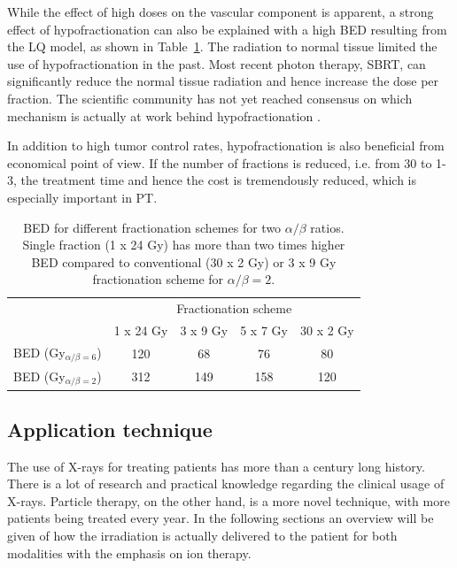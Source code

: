 While the effect of high doses on the vascular component is apparent, a strong effect of hypofractionation can also be explained with a high BED resulting from the LQ model, as shown in Table~\ref{Tab:BED}.
The radiation to normal tissue limited the use of hypofractionation in the past. Most recent photon therapy, SBRT, can significantly reduce the normal tissue radiation and hence increase the dose per fraction.
The scientific community has not yet reached consensus on which mechanism is actually at work behind hypofractionation \cite{Park2012a}.

In addition to high tumor control rates, hypofractionation is also beneficial from economical point of view. If the number of fractions is reduced, i.e. from 30 to 1-3, 
the treatment time and hence the cost is tremendously reduced, which is especially important in PT.

\begin{table}[H]
  \centering
  \caption{BED for different fractionation schemes for two $\alpha / \beta$ ratios. Single fraction (1 x 24 Gy) has more than two times higher BED compared to conventional
  (30 x 2 Gy) or 3 x 9 Gy fractionation scheme for $\alpha / \beta = 2$.}
  \begin{tabular}{c|c|c|c|c}
  & \multicolumn{4}{c}{Fractionation scheme} \\
		    & 1 x 24 Gy & 3 x 9 Gy & 5 x 7 Gy & 30 x 2 Gy \\
		    \hline
	    BED (Gy$_{\alpha / \beta=6}$)&120  & 68 & 76   &	80\\
	    BED (Gy$_{\alpha / \beta=2}$)&312	&149	&158&120\\
    \hline\hline
  \end{tabular}
  \label{Tab:BED}
\end{table}
  

  
\subsection{Application technique}

The use of X-rays for treating patients has more than a century long history. There is a lot of research and practical knowledge regarding the clinical usage of X-rays. Particle therapy, on the other hand, is a more novel technique, with
more patients being treated every year. In the following sections an overview will be given of how the irradiation is actually delivered to the patient for both modalities with the emphasis on ion therapy.

